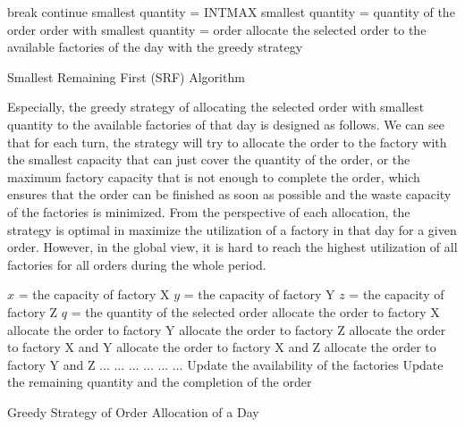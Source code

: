 \documentclass[a4paper, 12pt]{article}
\begin{document}
\begin{algorithm}[H]
     {
         {
            break\;
        }
         {
            continue\;
        }
        smallest quantity = INT\textunderscore MAX\;
         {
             {
                smallest quantity = quantity of the order\;
                order with smallest quantity = order\;
            }
        }
        allocate the selected order to the available factories of the day with the greedy strategy\;
    }
    \caption{Smallest Remaining First (SRF) Algorithm}
\end{algorithm}

Especially, the greedy strategy of allocating the selected order with smallest quantity to the available factories of that day is designed as follows. 
We can see that for each turn, the strategy will try to allocate the order to the factory with the smallest capacity that can just cover the quantity of the order, 
or the maximum factory capacity that is not enough to complete the order, which ensures that the order can be finished as soon as possible and the waste capacity of the factories is minimized.
From the perspective of each allocation, the strategy is optimal in maximize the utilization of a factory in that day for a given order. 
However, in the global view, it is hard to reach the highest utilization of all factories for all orders during the whole period.

\begin{algorithm}[H]
    $x$ = the capacity of factory X\;
    $y$ = the capacity of factory Y\;
    $z$ = the capacity of factory Z\;
    $q$ = the quantity of the selected order\;
     {
         {
            allocate the order to factory X\;
        }  {
            allocate the order to factory Y\;
        }  {
            allocate the order to factory Z\;
        }  {
            allocate the order to factory X and Y\;
        }  {
            allocate the order to factory X and Z\;
        }  {
            allocate the order to factory Y and Z\;
        } 
    }
     {
        ...
    }
     {
        ...
    }
     {
        ...
    }
     {
        ...
    }
     {
        ...
    }
     {
        ...
    }
    Update the availability of the factories\;
    Update the remaining quantity and the completion of the order\;
    \caption{Greedy Strategy of Order Allocation of a Day}
\end{algorithm}
\end{document}

